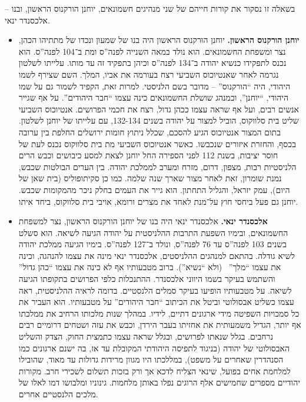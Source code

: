 \documentclass[]{article}
\newcommand\cb[1]   {\color{codeblue}#1\color{black}}
\begin{document}
    בשאלה זו נסקור את קורות חייהם של שני מנהיגים חשמונאים, יוחנן הורקנוס הראשון, ובנו – אלכסנדר ינאי. 
    \begin{itemize}
        \item \textbf{יוחנן הורקנוס הראשון. }יוחנן הוּרקנוס הראשון היה בנו של שמעון ונכדו של מתתיהו הכהן, נצר ומשפחת החשמונאים. הוא נולד במאה השנייה לפנה''ס ומת ב־104 לפנה''ס. \cb{הוא נכנס לתפקידו כנשיא יהודה ב־134 לפנה''ס וכיהן בתפקיד זה עד מותו}. עלייתו לשלטון נגרמה לאחר שאנטיוכוס השביעי רצח בעורמה את אביו, המלך. 
        השם שצירף לשמו היהודי, היה ``הורקנוס'' – \cb{מדובר בשם הלניסטי}. למרות זאת, הקפיד לשמור גם על שמו היהודי, ``יוחנן'', וכמנהג שושלת החשמונאים כינה עצמו ``חבר היהודים''. על אף שגייר אנשים רבים, ועל אף שראה עצמו ככהן גדול, \cb{רצח את חכמי הפרושים}. אנטיוכוס השביעי שליט בית סלווקוס, \cb{הוביל למצור על יהודה בשנים 132-134}, עם עלייתו של יוחנן לשלטון. בתום המצור אנטיוכוס הגיע להסכם, שכלל ניתוץ חומות ירושלים החלפת בין ערובה בכסף, והחזרת איזורים שנכבשו. כאשר אנטיוכוס השביעי מת בית סלווקוס נכנס לעת של חוסר יציבות, בשנת 112 לפני הספירה החל יוחנן לצאת למסע כיבושים וכבש הרים הלניסטיות רבות, מצפון, דרום, מזרח ומערב לממלכת יהודה. בין הערים הבולטות שכבש, נמנת שומרון, זאת לאחר מצור שארך שנה שלמה. כמו כן סקיתופוליס (בית שאן של היום), עמק יזראל, והגליל התחתון. הוא גייר את העמים בחלק ניכר מהמקומות שכבש. 
        יוחנן גם פעל ביחסי חוץ על־מנת לאחד את מצרים ורומא, אויבי בית סלווקוס, ביחד איתו. 
        \item \textbf{אלכסנדר ינאי.}
        אלכסנדר ינאי היה בנו של יוחנן הורקנוס הראשון, נצר למשפחת החשמונאים, ובימיו השפעת התרבות ההלניסטית על יהודה הגיעה לשיאה. הוא ס\cb{שלט בשנים 103 לפנה''ס עד 76 לפנה''ס}, ונולד ב־127 לפנה''ס. בימיו הגיעה ממלכת יהודה לשיא גודלה. \cb{בהתאם למנהגים ההלניסטים, אלכסנדר ינאי מינה את עצמו להנהגה, וכינה את עצמו ``מלך''} \, (ולא ``נשיא''). ברוב מטבעותיו אף לא כינה את עצמו ``כהן גדול'' ו\cb{השתמש בעיקר בשמו היווני אלכסנדר}. ההתנכלות כלפי הפרושים בתקופתו הגיעה לשיאה. על מטבעותיו הופיעו בעיקר סמלים הלנסטיים. בדומה לראיה ההלניסטית, ראה עצמו כשליט אבסולוטי וביטל את הכיתוב ``חבר היהודים'' על מטבעותיו. הוא העביר את כל סמכויות השפיטה מידי ארגונים דתיים, לידיו. במהלך שנות מלכותו הרחיב את ממלכתו אף יותר, הגדיל משמעותית את אחזיתו בעבר הירדן, וכבש את עזה ושטחים דרומיים רבים נרחבים. בגלל שנאתו לפרושים, ובגלל שראה עצמו כתמצית החוק, הצדק והשליט האבסולוטי של יהודה (בניגוד לתפיסה היהודתי המקובלת עד אז, בה ישנם ארגונים כמו הסנהדרין שאחרים על משפט), במללכתו היו מגוון מרידות גדולות עד מאוד, שהובילו למלחמת אחים בפועל, שינאי הצליח לדכא אך ורק בזכות תשלום לשכירי חרב. מקורות יהודיים מספרים שחמישים אלף הרוגים נפלו באותן מלחמות. גינוניו ומלבושו דמו לאלו של מלכים הלנסטיים אחרים. 
    \end{itemize}
    
\end{document}
